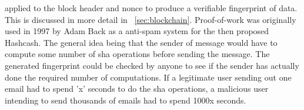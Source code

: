 applied to the block header and nonce to produce a verifiable fingerprint of
data. This is discussed in more detail in ~\ref{sec:blockchain}. Proof-of-work
was originally used in 1997 by Adam Back as a anti-spam system for the then
proposed Hashcash\cite{back2002hashcash}. The general idea being that the
sender of message would have to compute some number of sha operations before
sending the message.  The generated fingerprint could be checked by anyone to
see if the sender has actually done the required number of computations. If a
legitimate user sending out one email had to spend 'x' seconds to do the sha
operations, a malicious user intending to send thousands of emails had to spend
1000x seconds. 


%

